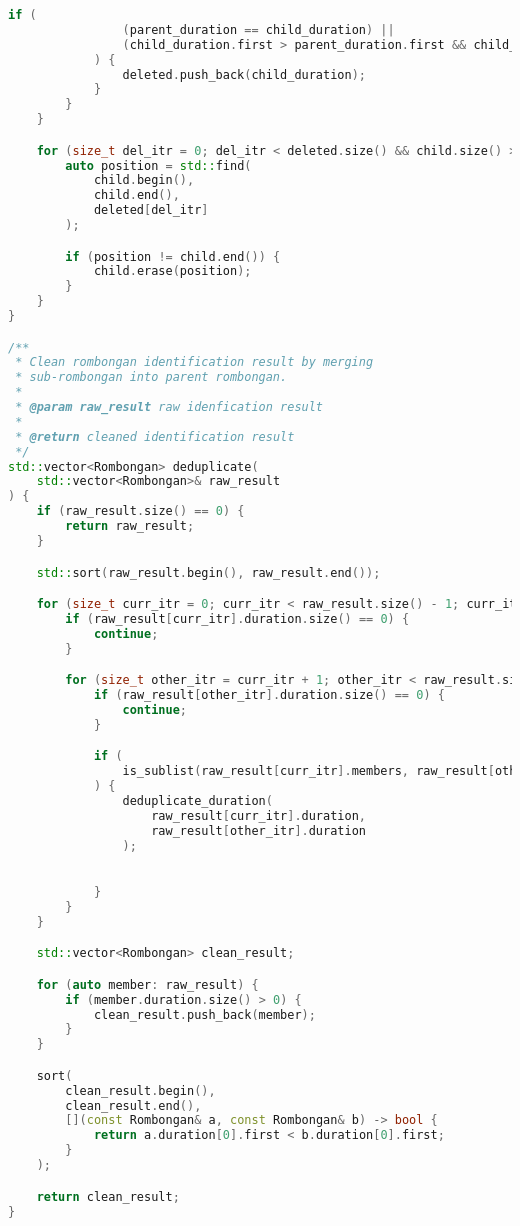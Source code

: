\begin{lstlisting}[language=C++, caption=Implementasi fungsi \texttt{identify\_rombongan}, label={lamp:identify-rombongan}]
            if (
                (parent_duration == child_duration) ||
                (child_duration.first > parent_duration.first && child_duration.second < parent_duration.second)
            ) {
                deleted.push_back(child_duration);
            }
        }
    }

    for (size_t del_itr = 0; del_itr < deleted.size() && child.size() > 0; del_itr++) {
        auto position = std::find(
            child.begin(),
            child.end(),
            deleted[del_itr]
        );

        if (position != child.end()) {
            child.erase(position);
        }
    }
}

/**
 * Clean rombongan identification result by merging
 * sub-rombongan into parent rombongan.
 * 
 * @param raw_result raw idenfication result
 *
 * @return cleaned identification result
 */
std::vector<Rombongan> deduplicate(
    std::vector<Rombongan>& raw_result
) {
    if (raw_result.size() == 0) {
        return raw_result;
    }

    std::sort(raw_result.begin(), raw_result.end());

    for (size_t curr_itr = 0; curr_itr < raw_result.size() - 1; curr_itr++) {
        if (raw_result[curr_itr].duration.size() == 0) {
            continue;
        }

        for (size_t other_itr = curr_itr + 1; other_itr < raw_result.size(); other_itr++) {
            if (raw_result[other_itr].duration.size() == 0) {
                continue;
            }

            if (
                is_sublist(raw_result[curr_itr].members, raw_result[other_itr].members)
            ) {
                deduplicate_duration(
                    raw_result[curr_itr].duration,
                    raw_result[other_itr].duration
                );

                
            }
        }
    }

    std::vector<Rombongan> clean_result;

    for (auto member: raw_result) {
        if (member.duration.size() > 0) {
            clean_result.push_back(member);
        }
    }

    sort(
        clean_result.begin(),
        clean_result.end(),
        [](const Rombongan& a, const Rombongan& b) -> bool {
            return a.duration[0].first < b.duration[0].first;
        }
    );

    return clean_result;
}



\end{lstlisting}
